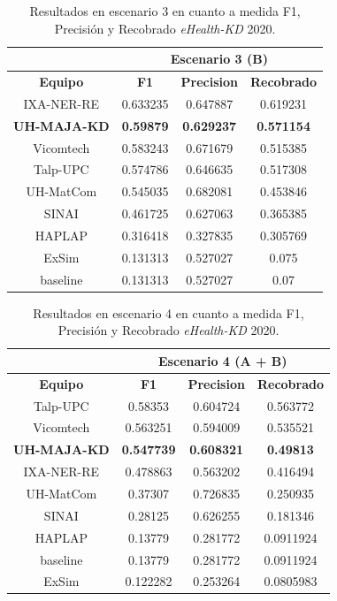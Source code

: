 \begin{table}[tb!]\centering
	\begin{tabular}{|c|c|c|c|}
		\hline
		&  \multicolumn{3}{c|}{\textbf{Escenario 3 (B)}} \\
		\hline
		\textbf{Equipo} & \textbf{F1} & \textbf{Precision} & \textbf{Recobrado} \\
		\hline
		IXA-NER-RE & 0.633235 & 0.647887 & 0.619231 \\
		\textbf{UH-MAJA-KD} & \textbf{0.59879} & \textbf{0.629237} & \textbf{0.571154} \\
		Vicomtech & 0.583243 & 0.671679 & 0.515385 \\
		Talp-UPC & 0.574786 & 0.646635 & 0.517308 \\
		UH-MatCom & 0.545035 & 0.682081 & 0.453846 \\
		SINAI & 0.461725 & 0.627063 & 0.365385 \\
		HAPLAP & 0.316418 & 0.327835 & 0.305769 \\
		ExSim & 0.131313 & 0.527027 & 0.075 \\
		baseline & 0.131313 & 0.527027 & 0.07 \\	
		\hline
	\end{tabular}
	\caption{Resultados en escenario 3 en cuanto a medida F1, Precisi\'on y Recobrado \textit{eHealth-KD} 2020. \label{table:results_20_escenario3}}
\end{table}

\begin{table}[tb!]\centering
	\begin{tabular}{|c|c|c|c|}
		\hline
		&  \multicolumn{3}{c|}{\textbf{Escenario 4 (A + B)}} \\
		\hline
		\textbf{Equipo} & \textbf{F1} & \textbf{Precision} & \textbf{Recobrado} \\
		\hline
		Talp-UPC & 0.58353 & 0.604724 & 0.563772 \\
		Vicomtech & 0.563251 & 0.594009 & 0.535521 \\
		\textbf{UH-MAJA-KD} & \textbf{0.547739} & \textbf{0.608321} & \textbf{0.49813} \\
		IXA-NER-RE & 0.478863 & 0.563202 & 0.416494 \\
		UH-MatCom & 0.37307 & 0.726835 & 0.250935 \\
		SINAI & 0.28125 & 0.626255 & 0.181346 \\
		HAPLAP & 0.13779 & 0.281772 & 0.0911924 \\
		baseline & 0.13779 & 0.281772 & 0.0911924 \\
		ExSim & 0.122282 & 0.253264 & 0.0805983 \\	
		\hline
	\end{tabular}
	\caption{Resultados en escenario 4 en cuanto a medida F1, Precisi\'on y Recobrado \textit{eHealth-KD} 2020. \label{table:results_20_escenario4}}
\end{table}

